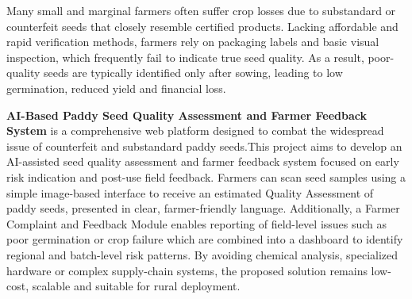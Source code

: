 \vspace{1cm}
{
\fontsize{12}{14}\selectfont
Many small and marginal farmers often suffer crop losses due to substandard or counterfeit seeds that closely resemble certified products. Lacking affordable and rapid verification methods, farmers rely on packaging labels and basic visual inspection, which frequently fail to indicate true seed quality. As a result, poor-quality seeds are typically identified only after sowing, leading to low germination, reduced yield and financial loss. 

\textbf{AI-Based Paddy Seed Quality Assessment and Farmer Feedback System} is a comprehensive web platform designed to combat the widespread issue of counterfeit and substandard paddy seeds.This project aims to develop an AI-assisted seed quality assessment and farmer feedback system focused on early risk indication and post-use field feedback. Farmers can scan seed samples using a simple image-based interface to receive an estimated Quality Assessment of paddy seeds, presented in clear, farmer-friendly language. Additionally, a Farmer Complaint and Feedback Module enables reporting of field-level issues such as poor germination or crop failure which are combined into a dashboard to identify regional and batch-level risk patterns. By avoiding chemical analysis, specialized hardware or complex supply-chain systems, the proposed solution remains low-cost, scalable and suitable for rural deployment. 
}